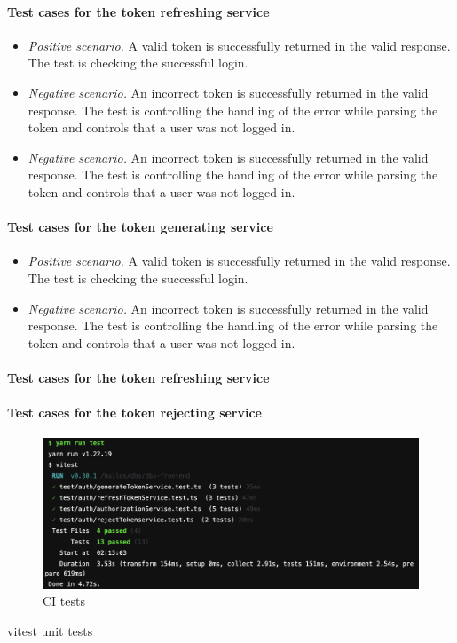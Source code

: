 \paragraph*{Test cases for the token refreshing service} 
\begin{itemize}
    \item \emph{Positive scenario.} A valid token is successfully returned in the valid response. The test is checking the successful login.
    \item \emph{Negative scenario.} An incorrect token is successfully returned in the valid response. The test is controlling the handling of the error while parsing the token and controls that a user was not logged in.
    \item \emph{Negative scenario.} An incorrect token is successfully returned in the valid response. The test is controlling the handling of the error while parsing the token and controls that a user was not logged in.
\end{itemize}

\paragraph*{Test cases for the token generating service} 
\begin{itemize}
    \item \emph{Positive scenario.} A valid token is successfully returned in the valid response. The test is checking the successful login.
    \item \emph{Negative scenario.} An incorrect token is successfully returned in the valid response. The test is controlling the handling of the error while parsing the token and controls that a user was not logged in.
\end{itemize}


\paragraph*{Test cases for the token refreshing service} 

\paragraph*{Test cases for the token rejecting service} 


\begin{figure}[h]
\centering
\includegraphics[scale=0.475]{../png/tests.png}
\caption{CI tests}\label{picture:tests}
\end{figure}

vitest unit tests
